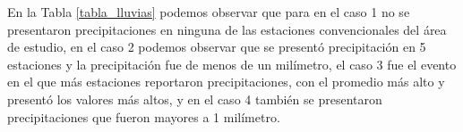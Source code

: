 \begin{itemize}
\begin{table}[H]
\begin{tabular}{llp{4cm}ll}
\end{tabular}
\end{table}

En la Tabla \ref{tabla_lluvias} podemos observar que para en el caso 1 no se presentaron precipitaciones en ninguna de las estaciones convencionales del área de estudio, en el caso 2 podemos observar que se presentó precipitación en 5 estaciones y la precipitación fue de menos de un milímetro, el caso 3 fue el evento en el que más estaciones reportaron precipitaciones, con el promedio más alto y presentó los valores más altos, y en el caso 4 también se presentaron precipitaciones que fueron mayores a 1 milímetro.







\end{itemize}

